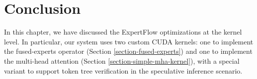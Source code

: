 \section{Conclusion}
In this chapter, we have discussed the ExpertFlow optimizations at the kernel level. In particular, our system uses two custom CUDA kernels: one to implement the fused-experts operator (Section \ref{section-fused-experts}) and one to implement the multi-head attention (Section \ref{section-simple-mha-kernel}), with a special variant to support token tree verification in the speculative inference scenario.